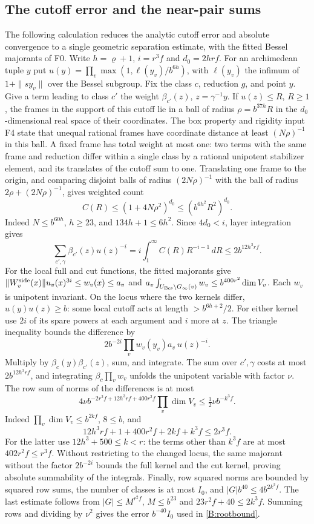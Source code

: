 \subsection{The cutoff error and the near-pair sums}
\label{B:cutoff}
The following calculation reduces the analytic cutoff error and
absolute convergence to a single geometric separation estimate, with
the fitted Bessel majorants of F0. Write \(h=\varrho+1\), \(i=r^3f\)
and \(d_0=2hrf\). For an archimedean tuple \(y\) put
\(u(y)=\prod_v\max(1,\ell(y_v)/b^{6h})\), with \(\ell(y_v)\) the
infimum of \(1+\|s y_v\|\) over the Bessel subgroup. Fix the class
\(c\), reduction \(g\), and point \(y\). Give a term leading to
class \(c'\) the weight \(\beta_{c'}(z)\), \(z=\gamma^{-1}y\).
If \(u(z)\le R\), \(R\ge1\), the frames in the support of this
cutoff lie in a ball of radius \(\rho=b^{37h}R\) in the
\(d_0\)-dimensional real space of their coordinates. The box property
and rigidity input F4 state that unequal rational frames have
coordinate distance at least \((N\rho)^{-1}\) in this ball.
A fixed frame has total weight at most one: two terms with the same
frame and reduction differ within a single class by a rational
unipotent stabilizer element, and its translates of the cutoff sum
to one. Translating one frame to the origin, and comparing disjoint
balls of radius \((2N\rho)^{-1}\) with the ball of radius
\(2\rho+(2N\rho)^{-1}\), gives weighted count
\[
 C(R)\le(1+4N\rho^2)^{d_0}
     \le (b^{6h^2}R^2)^{d_0}.
\]
Indeed \(N\le b^{60h}\), \(h\ge23\), and \(134h+1\le6h^2\).
Since \(4d_0<i\), layer integration gives
\[
 \sum_{c',\gamma}\beta_{c'}(z)u(z)^{-i}
   =i\int_1^\infty C(R)R^{-i-1}\,dR
   \le 2b^{12h^3rf}.
\]
For the local full and cut functions, the fitted majorants give
\(\|W_v^{\rm side}(x)\|u_v(x)^{3i}\le w_v(x)\le a_v\) and
\(a_v\int_{U_{\rm Bes}\backslash G_\infty(v)}w_v\le
 b^{400r^2}\dim V_v\). Each \(w_v\) is unipotent invariant.
On the locus where the two kernels differ,
\(u(y)u(z)\ge b\): some local cutoff acts at length
\(>b^{6h+2}/2\). For either kernel use \(2i\) of its spare powers at
each argument and \(i\) more at \(z\). The triangle inequality bounds
the difference by
\[
 2 b^{-2i}\prod_v w_v(y_v)a_v\ u(z)^{-i}.
\]
Multiply by \(\beta_c(y)\beta_{c'}(z)\), sum, and integrate. The
sum over \(c',\gamma\) costs at most \(2b^{12h^3rf}\), and integrating
\(\beta_c\prod_v w_v\) unfolds the unipotent variable with factor
\(\nu\). The row sum of norms of the differences is at most
\[
 4\nu b^{-2r^3 f+12h^3rf+400r^2 f}\prod_v\dim V_v
   \le \tfrac12\nu b^{-k^3f}.
\]
Indeed \(\prod_v\dim V_v\le b^{2kf}\), \(8\le b\), and
\[
 12h^3rf+1+400r^2f+2kf+k^3f\le 2r^3f.
\]
For the latter use \(12h^3+500\le k<r\): the terms other than
\(k^3f\) are at most \(402r^2f\le r^3f\). Without restricting to
the changed locus, the same majorant without the factor
\(2b^{-2i}\) bounds the full kernel and the cut kernel, proving
absolute summability of the integrals. Finally, row squared norms
are bounded by squared row sums, the number of classes is at most
\(I_0\), and \(|G|b^{40}\le4b^{2k^3f}\). The last estimate follows
from \(|G|\le M^{r^2 f}\), \(M\le b^{23}\) and
\(23r^2f+40\le2k^3f\). Summing rows and dividing by \(\nu^2\) gives
the error \(b^{-40}I_0\) used in \eqref{B:rootbound}.

